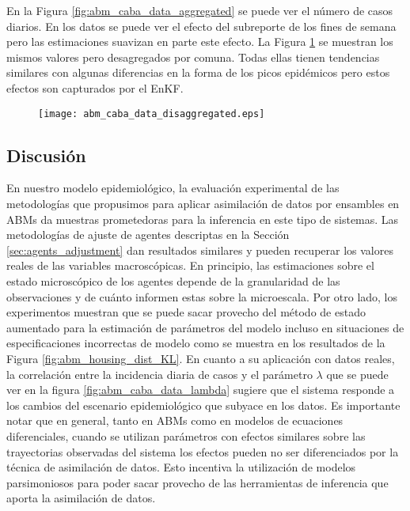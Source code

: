 En la Figura \ref{fig:abm_caba_data_aggregated} se puede ver el número de casos diarios. En los datos se puede ver el efecto del subreporte de los fines de semana pero las estimaciones suavizan en parte este efecto. La Figura \ref{fig:abm_caba_data_disaggregated} se muestran los mismos valores pero desagregados por comuna. Todas ellas tienen tendencias similares con algunas diferencias en la forma de los picos epidémicos pero estos efectos son capturados por el EnKF.

\begin{figure}[h]
    \centering
    \texttt{[image: abm\_caba\_data\_disaggregated.eps]}
    \caption{}
    \label{fig:abm_caba_data_disaggregated}
\end{figure}

\subsection{Discusión}

En nuestro modelo epidemiológico, la evaluación experimental de las metodologías que propusimos para aplicar asimilación de datos por ensambles en ABMs da muestras prometedoras para la inferencia en este tipo de sistemas. Las metodologías de ajuste de agentes descriptas en la Sección \ref{sec:agents_adjustment} dan resultados similares y pueden recuperar los valores reales de las variables macroscópicas. En principio, las estimaciones sobre el estado microscópico de los agentes depende de la granularidad de las observaciones y de cuánto informen estas sobre la microescala. Por otro lado, los experimentos muestran que se puede sacar provecho del método de estado aumentado para la estimación de parámetros del modelo incluso en situaciones de especificaciones incorrectas de modelo como se muestra en los resultados de la Figura \ref{fig:abm_housing_dist_KL}. En cuanto a su aplicación con datos reales, la correlación entre la incidencia diaria de casos y el parámetro $\lambda$ que se puede ver en la figura \ref{fig:abm_caba_data_lambda} sugiere que el sistema responde a los cambios del escenario epidemiológico que subyace en los datos. Es importante notar que en general, tanto en ABMs como en modelos de ecuaciones diferenciales, cuando se utilizan parámetros con efectos similares sobre las trayectorias observadas del sistema los efectos pueden no ser diferenciados por la técnica de asimilación de datos. Esto incentiva la utilización de modelos parsimoniosos para poder sacar provecho de las herramientas de inferencia que aporta la asimilación de datos.
